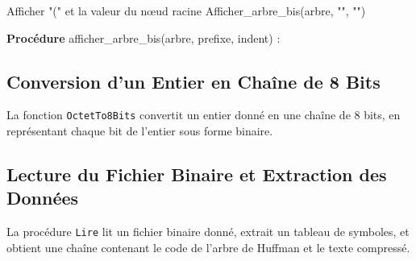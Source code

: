 \documentclass[12pt,a4paper]{article}
\begin{document}
\begin{algorithm}
    \caption{Affichage de l'arbre de Huffman}
    Afficher "(" et la valeur du nœud racine\;
    Afficher\_arbre\_bis(arbre, "", "")\;
    
    \textbf{Procédure} afficher\_arbre\_bis(arbre, prefixe, indent) :
\end{algorithm}

\subsection{Conversion d'un Entier en Chaîne de 8 Bits}

La fonction \texttt{OctetTo8Bits} convertit un entier donné en une chaîne de 8 bits, en représentant chaque bit de l'entier sous forme binaire.

\begin{algorithm}
    \caption{Conversion d'un entier en une chaîne de 8 bits}
\end{algorithm}

\subsection{Lecture du Fichier Binaire et Extraction des Données}

La procédure \texttt{Lire} lit un fichier binaire donné, extrait un tableau de symboles, et obtient une chaîne contenant le code de l'arbre de Huffman et le texte compressé.
\end{document}
